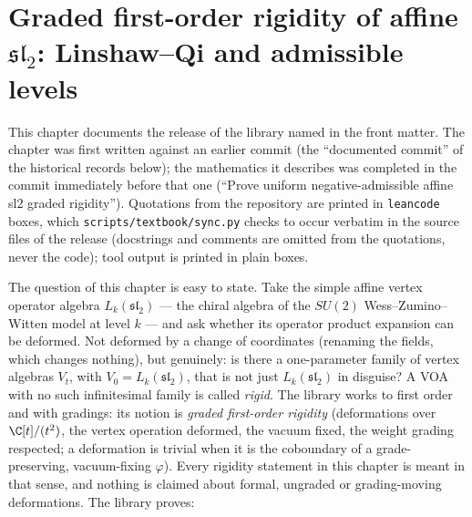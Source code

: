 \chapter{Graded first-order rigidity of affine \texorpdfstring{$\mathfrak{sl}_2$}{sl(2)}: Linshaw--Qi and admissible levels}\label{ch:L09}

\providecommand{\lninesl}{\mathfrak{sl}_2}
\providecommand{\lnineg}{\mathfrak{g}}
\providecommand{\lnineV}{\mathcal{V}}
\providecommand{\lnineone}{\mathbf{1}}
\providecommand{\lnineDer}{\operatorname{Der}}
\providecommand{\lninead}{\operatorname{ad}}
\providecommand{\lninehat}{\widehat{\mathfrak{sl}}_2}

This chapter documents the release of the library named in the front matter. The chapter was first written against an earlier commit (the ``documented
commit'' of the historical records below); the mathematics it describes was completed in the commit
immediately before that one (``Prove uniform negative-admissible affine sl2 graded
rigidity''). Quotations from the repository are printed in \texttt{leancode} boxes, which
\texttt{scripts/textbook/sync.py} checks to occur verbatim in the source files of the release
(docstrings and comments are omitted from the quotations, never the code);
tool output is printed in plain boxes.

The question of this chapter is easy to state. Take the simple affine vertex operator algebra
$L_k(\lninesl)$ --- the chiral algebra of the $SU(2)$ Wess--Zumino--Witten model at level $k$ --- and
ask whether its operator product expansion can be deformed. Not deformed by a change of
coordinates (renaming the fields, which changes nothing), but genuinely: is there a one-parameter
family of vertex algebras $V_t$, with $V_0 = L_k(\lninesl)$, that is not just $L_k(\lninesl)$ in
disguise? A VOA with no such infinitesimal family is called \emph{rigid}. The library works to first
order and with gradings: its notion is \emph{graded first-order rigidity} (deformations over
$\C[t]/(t^2)$, the vertex operation deformed, the vacuum fixed, the weight grading respected; a
deformation is trivial when it is the coboundary of a grade-preserving, vacuum-fixing $\varphi$). Every
rigidity statement in this chapter is meant in that sense, and nothing is claimed about formal,
ungraded or grading-moving deformations. The library proves:

